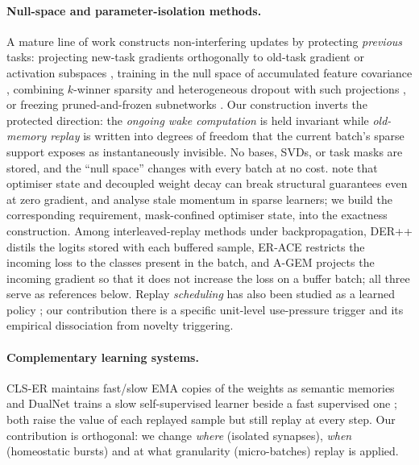 \documentclass{article}
\begin{document}
\paragraph{Null-space and parameter-isolation methods.}
A mature line of work constructs non-interfering updates by protecting \emph{previous} tasks:
projecting new-task gradients orthogonally to old-task gradient or activation subspaces
\citep{farajtabar2020,saha2021}, training in the null space of accumulated feature covariance
\citep{wangnscl2021}, combining $k$-winner sparsity and heterogeneous dropout with such
projections \citep{abbasi2022}, or freezing pruned-and-frozen subnetworks
\citep{golkar2019,mallya2018}. Our construction inverts the protected direction: the
\emph{ongoing wake computation} is held invariant while \emph{old-memory replay} is written into
degrees of freedom that the current batch's sparse support exposes as instantaneously
invisible. No bases, SVDs, or task masks are stored, and the ``null space'' changes with every
batch at no cost. \citet{mckee2026} note that optimiser state and decoupled weight decay can
break structural guarantees even at zero gradient, and \citet{bricken2023} analyse stale
momentum in sparse learners; we build the corresponding requirement, mask-confined optimiser
state, into the exactness construction. Among interleaved-replay methods under
backpropagation, DER++ \citep{buzzega2020} distils the logits stored with each buffered
sample, ER-ACE \citep{caccia2022} restricts the incoming loss to the classes present in the
batch, and A-GEM \citep{chaudhry2019} projects the incoming gradient so that it does not
increase the loss on a buffer batch; all three serve as references below. Replay
\emph{scheduling} has also been studied as a learned policy \citep{klasson2023}; our
contribution there is a specific unit-level use-pressure trigger and its empirical
dissociation from novelty triggering.

\paragraph{Complementary learning systems.}
CLS-ER maintains fast/slow EMA copies of the weights as semantic memories \citep{arani2022} and
DualNet trains a slow self-supervised learner beside a fast supervised one \citep{pham2021}; both
raise the value of each replayed sample but still replay at every step. Our contribution is
orthogonal: we change \emph{where} (isolated synapses), \emph{when} (homeostatic bursts) and at
what granularity (micro-batches) replay is applied.
\end{document}
